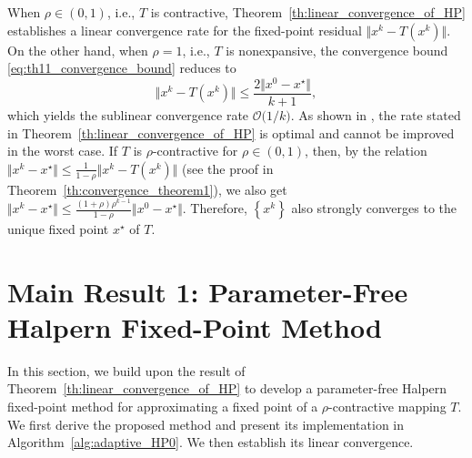 \documentclass{article}
\theoremstyle{plain}
\theoremstyle{definition}
\newcommand{\set}[1]{\left\{#1\right\}}
\newcommand{\norms}[1]{\Vert#1\Vert}
\newcommand{\0}{\boldsymbol{0}}
\newcommand{\BigOs}[1]{\mathcal{O}\big(#1\big)}
\begin{document}
When $\rho \in (0,1)$, i.e., $T$ is contractive, Theorem~\ref{th:linear_convergence_of_HP} establishes a linear convergence rate for the fixed-point residual $\norms{x^k - T(x^k)}$. On the other hand, when $\rho = 1$, i.e., $T$ is nonexpansive, the convergence bound \eqref{eq:th11_convergence_bound} reduces to
\begin{equation*}
\norms{x^k - T(x^k)} \leq \frac{2\norms{x^0 - x^{\star}}}{k+1},
\end{equation*}
which yields the sublinear convergence rate $\BigOs{1/k}$. 
As shown in \cite{park2022exact}, the rate stated in Theorem~\ref{th:linear_convergence_of_HP} is optimal and cannot be improved in the worst case.
If $T$ is $\rho$-contractive for $\rho \in (0, 1)$, then, by the relation $\norms{x^k - x^{\star}} \leq \frac{1}{1-\rho}\norms{x^k - T(x^k)}$ (see the proof in Theorem~\ref{th:convergence_theorem1}), we also get $\norms{x^k - x^{\star}} \leq \frac{(1+\rho)\rho^{k-1}}{1-\rho}\norms{x^0 - x^{\star}}$.
Therefore, $\set{x^k}$ also strongly converges to the unique fixed point $x^{\star}$ of $T$.

\section{Main Result 1: Parameter-Free Halpern Fixed-Point Method}\label{sec:linear_convergence_rate}
In this section, we build upon the result of Theorem~\ref{th:linear_convergence_of_HP} to develop a parameter-free Halpern fixed-point method for approximating a fixed point of a $\rho$-contractive mapping $T$. 
We first derive the proposed method and present its implementation in Algorithm~\ref{alg:adaptive_HP0}. We then establish its linear convergence.

\end{document}
